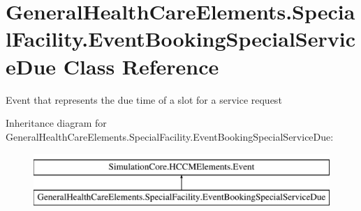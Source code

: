 \hypertarget{class_general_health_care_elements_1_1_special_facility_1_1_event_booking_special_service_due}{}\section{General\+Health\+Care\+Elements.\+Special\+Facility.\+Event\+Booking\+Special\+Service\+Due Class Reference}
\label{class_general_health_care_elements_1_1_special_facility_1_1_event_booking_special_service_due}


Event that represents the due time of a slot for a service request  


Inheritance diagram for General\+Health\+Care\+Elements.\+Special\+Facility.\+Event\+Booking\+Special\+Service\+Due\+:\begin{figure}[H]
\begin{center}
\leavevmode
\includegraphics[height=2.000000cm]{class_general_health_care_elements_1_1_special_facility_1_1_event_booking_special_service_due}
\end{center}
\end{figure}
